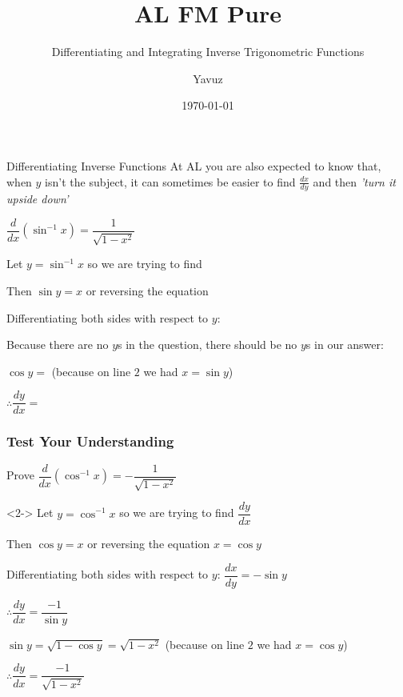 \documentclass{beamer}
\title[Pure]{{\color{aa}\Huge\adfbullet{9}}AL FM Pure}
\subtitle{Differentiating and Integrating Inverse Trigonometric Functions}
\author{Yavuz}
\date{\today}
\begin{document}
	
	\setlength{\abovedisplayskip}{0pt}
	\setlength{\belowdisplayskip}{0pt}
	\setlength{\abovedisplayshortskip}{0pt}
	\setlength{\belowdisplayshortskip}{0pt}
	
	\frame{\titlepage}
	
	
	\begin{frame}[shrink=15]{Differentiating Inverse Functions }
		\alert<1>{At AL you are also expected to know that, when $y$ isn't the subject, it can sometimes be easier to find $\frac{dx}{dy}$ and then \emph{'turn it upside down'}}
		
		\begin{definition}
			$\dfrac{d}{dx}\left( \sin ^{-1}x\right) =\dfrac{1}{\sqrt{1-x^{2}}}$
		\end{definition}
		
		Let $y = \sin ^{-1}x$ so we are trying to find 
		
		Then $\sin y = x$ or reversing the equation 
		
		Differentiating both sides with respect to $y$: 
		
		Because there are no $y$s in the question, there should be no $y$s in our answer: 
		
		$\cos y=$ (because on line $2$ we had $x = \sin y$)
		
		$\therefore\dfrac{dy}{dx}=$
	\end{frame}
	
	
	\begin{frame}[shrink=15]
		\frametitle{Test Your Understanding}
		\begin{problem}
			Prove $\dfrac{d}{dx}\left( \cos ^{-1}x\right) =-\dfrac{1}{\sqrt{1-x^{2}}}$
		\end{problem}
		
		\begin{solution}<2->
			Let $y = \cos^{-1}x$ so we are trying to find $\dfrac{dy}{dx}$ 
			
			Then $\cos y = x$ or reversing the equation $x = \cos y$
			
			Differentiating both sides with respect to $y$: $\dfrac{dx}{dy} = -\sin y$
			
			$\therefore \dfrac{dy}{dx}=\dfrac{-1}{\sin y}$
			
			$\sin y=\sqrt{1-\cos y}=\sqrt{1-x^{2}}$ (because on line $2$ we had $x = \cos y$)
			
			$\therefore \dfrac{dy}{dx}=\dfrac{-1}{\sqrt{1-x^{2}}}$
			
		\end{solution}
	\end{frame}
	
\end{document}
